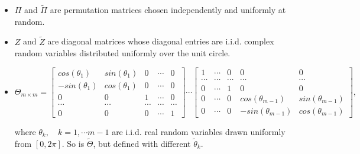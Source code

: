 \begin{itemize}
\item $\Pi$ and $\tilde{\Pi}$ are permutation matrices chosen independently and uniformly at random. \\
\item $Z$ and $\tilde{Z}$ are diagonal matrices whose diagonal entries are i.i.d. complex random variables distributed uniformly over the unit circle. \\
\item
 $\Theta_{m \times m} = \begin{bmatrix} cos(\theta_1)& sin(\theta_1) & 0& \cdots &0\\
                                                                     - sin(\theta_1)  & cos(\theta_1) & 0 & \cdots & 0 \\
                                                                           0 & 0 & 1 & \cdots & 0 \\
                                                                               \cdots & \cdots & \cdots & \cdots & \cdots  \\
                                                                                  0 & 0 &0 & \cdots & 1
                                                   \end{bmatrix}
                                                                                  \cdots
                                                        \begin{bmatrix} 1& \cdots & 0& 0  &0\\
                                                                             \cdots  & \cdots  & \cdots & \cdots & \cdots \\
                                                                              0 & \cdots & 1 & 0 & 0 \\
                                                                              0 & \cdots & 0 & cos(\theta_{m-1})& sin(\theta_{m-1}) \\
                                                                             0 & \cdots &0 &  -sin(\theta_{m-1}) & cos(\theta_{m-1})
                                                         \end{bmatrix} ,$


 where $\theta_k, \quad k =1 ,\cdots m-1$ are i.i.d. real random variables drawn uniformly from $[0,2\pi]$.
 So is $\tilde{\Theta}$, but defined with different $\tilde{\theta}_k$.

\end{itemize}

